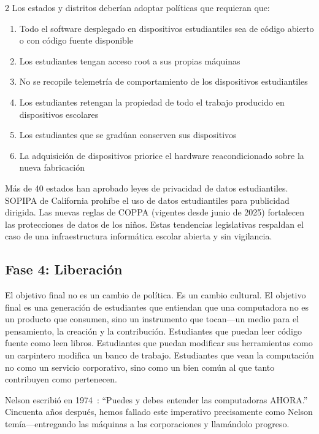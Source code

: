 \documentclass[11pt, a4paper]{article}
\begin{document}
\begin{multicols}{2}
Los estados y distritos deberían adoptar políticas que requieran que:

\begin{enumerate}
  \item Todo el software desplegado en dispositivos estudiantiles sea de código abierto o con código fuente disponible
  \item Los estudiantes tengan acceso root a sus propias máquinas
  \item No se recopile telemetría de comportamiento de los dispositivos estudiantiles
  \item Los estudiantes retengan la propiedad de todo el trabajo producido en dispositivos escolares
  \item Los estudiantes que se gradúan conserven sus dispositivos
  \item La adquisición de dispositivos priorice el hardware reacondicionado sobre la nueva fabricación
\end{enumerate}

Más de 40 estados han aprobado leyes de privacidad de datos estudiantiles. SOPIPA de California prohíbe el uso de datos estudiantiles para publicidad dirigida. Las nuevas reglas de COPPA (vigentes desde junio de 2025) fortalecen las protecciones de datos de los niños. Estas tendencias legislativas respaldan el caso de una infraestructura informática escolar abierta y sin vigilancia.

\subsection{Fase 4: Liberación}

El objetivo final no es un cambio de política. Es un cambio cultural. El objetivo final es una generación de estudiantes que entiendan que una computadora no es un producto que consumen, sino un instrumento que tocan---un medio para el pensamiento, la creación y la contribución. Estudiantes que puedan leer código fuente como leen libros. Estudiantes que puedan modificar sus herramientas como un carpintero modifica un banco de trabajo. Estudiantes que vean la computación no como un servicio corporativo, sino como un bien común al que tanto contribuyen como pertenecen.

Nelson escribió en 1974~\citep{nelson1974computerlib}: ``Puedes y debes entender las computadoras AHORA.'' Cincuenta años después, hemos fallado este imperativo precisamente como Nelson temía---entregando las máquinas a las corporaciones y llamándolo progreso.


\end{multicols}
\end{document}
